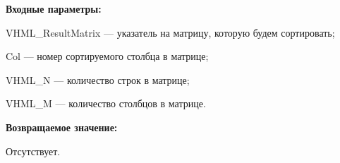 \textbf{Входные параметры:}
 
VHML\_ResultMatrix --- указатель на матрицу, которую будем сортировать;
 
Col --- номер сортируемого столбца в матрице;
 
VHML\_N --- количество строк в матрице;
 
VHML\_M --- количество столбцов в матрице.

\textbf{Возвращаемое значение:}

Отсутствует.